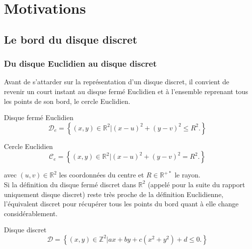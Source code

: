 \section{Motivations}

\subsection{Le bord du disque discret}

\subsubsection{Du disque Euclidien au disque discret}

Avant de s'attarder sur la représentation d'un disque discret, il convient de revenir un court instant au disque fermé Euclidien et à l'ensemble reprenant tous les points de son bord, le cercle Euclidien.

\begin{Definition}{Disque fermé Euclidien}
\label{def:disk-euc}
 $$\mathcal{D}_e =  \left\{ (x,y) \in \mathbb{R}^{2} |  (x - u)^2 + (y - v)^2 \leq R^2. \right\}$$
\end{Definition}

\begin{Definition}{Cercle Euclidien}
\label{def:cer-euc}
  $$\mathcal{C}_e =  \left\{ (x,y) \in \mathbb{R}^{2} |  (x - u)^2 + (y - v)^2 = R^2. \right\}$$
\end{Definition}

avec $(u,v) \in \mathbb{R}^{2}$ les coordonnées du centre et $R \in \mathbb{R}^{+*}$ le rayon.\\


Si la définition du disque fermé discret dans $\mathbb{R}^{2}$ (appelé pour la suite du rapport uniquement disque discret) reste très proche de la définition Euclidienne, l'équivalent discret pour récupérer tous les points du bord quant à elle change considérablement.

\begin{Definition}{Disque discret}
\label{def:disk-dis}
$$\mathcal{D} =  \left\{ (x,y) \in \mathbb{Z}^{2} |  ax + by + c(x^2 + y^2) + d \leq 0. \right\}$$
\end{Definition}

